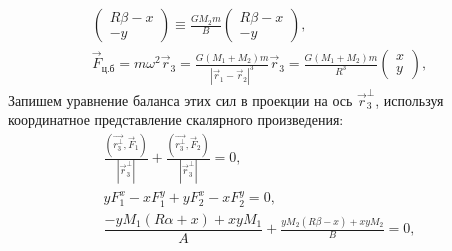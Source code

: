 {\begin{gather*}
\begin{pmatrix}
R\beta - x\\
-y
\end{pmatrix} \equiv \frac{G M_2 m}{B}\begin{pmatrix}
R\beta - x\\
-y
\end{pmatrix},\\
\vec{F}_\text{ц.б} = m\omega^2 \vec{r}_3 = \frac{G (M_1 + M_2)m}{|\vec{r}_1 - \vec{r}_2|^3} \vec{r}_3 = \frac{G(M_1 + M_2)m}{R^3} \begin{pmatrix}
x\\
y
\end{pmatrix},
\end{gather*}
Запишем уравнение баланса этих сил в проекции на ось $\vec{r}_3^\perp$, используя координатное представление скалярного произведения:
\begin{gather*}
\frac{ \left( \vec{r_3^\perp},  \vec{F}_1 \right)}{\left| \vec{r}_3^\perp \right|} + \frac{ \left( \vec{r_3^\perp}, \vec{F}_2 \right)}{\left| \vec{r}_3^\perp \right|} = 0,\\
y F_1^x - x F_1^y + y F_2^x - x F_2^y = 0,\\
\dfrac{-y M_1 (R\alpha + x ) + x y M_1}{A} 	+ \frac{y M_2(R\beta - x) + xy  M_2}{B}= 0,\\

\end{gather*}}
